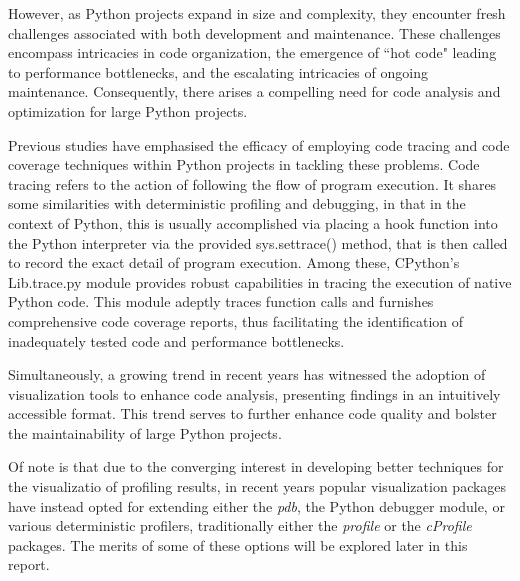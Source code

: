 \documentclass[conference]{IEEEtran}
\begin{document}
However, as Python projects expand in size and complexity, they encounter fresh challenges associated with both development and maintenance. These challenges encompass intricacies in code organization, the emergence of ``hot code" leading to performance bottlenecks, and the escalating intricacies of ongoing maintenance\cite{peng2021empirical}. Consequently, there arises a compelling need for code analysis and optimization for large Python projects\cite{ray2014large}.

Previous studies have emphasised the efficacy of employing code tracing and code coverage techniques within Python projects in tackling these problems. Code tracing refers to the action of following the flow of program execution. It shares some similarities with deterministic profiling and debugging, in that in the context of Python, this is usually accomplished via placing a hook function into the Python interpreter via the provided sys.settrace() method, that is then called to record the exact detail of program execution. Among these, CPython's Lib.trace.py module provides robust capabilities in tracing the execution of native Python code\cite{aakerblom2014tracing}. This module adeptly traces function calls and furnishes comprehensive code coverage reports, thus facilitating the identification of inadequately tested code and performance bottlenecks. \par
 
Simultaneously, a growing trend in recent years has witnessed the adoption of visualization tools to enhance code analysis, presenting findings in an intuitively accessible format\cite{cao2021research,fernandez2023empirical}. This trend serves to further enhance code quality and bolster the maintainability of large Python projects.\par

Of note is that due to the converging interest in developing better techniques for the visualizatio of profiling results, in recent years popular visualization packages have instead opted for extending either the \textit{pdb}, the Python debugger module, or various deterministic profilers, traditionally either the \textit{profile} or the \textit{cProfile} packages. The merits of some of these options will be explored later in this report.\par
\end{document}
